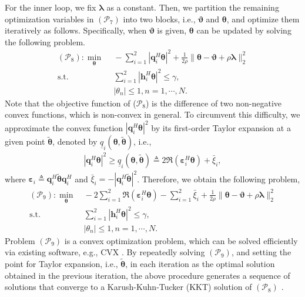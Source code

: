 \documentclass[10pt,final,doublecolumn]{IEEEtran}
\begin{document}
For the inner loop, we fix $\boldsymbol{\lambda}$ as a constant. Then, we partition the remaining optimization variables in $(\mathcal{P}_7)$ into two blocks, i.e., $\boldsymbol{\vartheta}$ and $\boldsymbol{\theta}$, and optimize them iteratively as follows. Specifically, when $\boldsymbol{\vartheta}$ is given, $\boldsymbol{\theta}$ can be  updated by solving the following problem.
\begin{subequations}
\begin{align}
(\mathcal{P}_8): \mathop{\min}\limits_{\boldsymbol{\theta}}~&~ -\sum_{i=1}^{2}|\mathbf{q}_i^H
\boldsymbol{\theta}|^2+\frac{1}{2\rho}\|\boldsymbol{\theta}-\boldsymbol{\vartheta} +\rho\boldsymbol{\lambda}\|_2^2 \label{OP3}\\
\text {s.t.}~&~\sum_{i=1}^{2}|{\mathbf{h}}_i^H
\boldsymbol{\theta}|^2\leq \gamma, \label{cd1}\\
~&~|\theta_n|\leq 1, n=1,\cdots,N. \label{ccc3}
\end{align}
\end{subequations}
Note that the objective function of ($\mathcal{P}_8$) is the difference of two non-negative convex functions, which is non-convex in general. To circumvent this difficulty, we approximate the convex function
$|\mathbf{q}_i^H\boldsymbol{\theta}|^2$ by its first-order Taylor expansion at a given point ${\tilde{\boldsymbol{\theta}}}$, denoted by $\underline{q}_i(\boldsymbol{\theta},{\tilde{\boldsymbol{\theta}}})$, i.e.,
\begin{align}\label{taylor1}
|\mathbf{q}_i^H\boldsymbol{\theta}|^2\geq\underline{q}_i(\boldsymbol{\theta}, {\tilde{\boldsymbol{\theta}}}) \triangleq 2 \Re(\bm{\varepsilon}_i^H\boldsymbol{\theta})+\bar{\xi}_i,
\end{align}
where $\bm{\varepsilon}_i\triangleq\mathbf{q}_i^H {\tilde{\boldsymbol{\theta}}}\mathbf{q}_i^H$ and $\bar{\xi}_i=-|\mathbf{q}_i^H{\tilde{\boldsymbol{\theta}}}|^2$.
Therefore, we obtain the following problem,
\begin{subequations}
\begin{align}
(\mathcal{P}_9): \mathop{\min}\limits_{\boldsymbol{\theta}}&~ -2 \sum_{i=1}^{2}\Re(\bm{\varepsilon}_i^H\boldsymbol{\theta})-\sum_{i=1}^{2}\bar{\xi}_i+\frac{1}{2\rho}\|\boldsymbol{\theta}-\boldsymbol{\vartheta} +\rho\boldsymbol{\lambda}\|_2^2 \label{OlP3}\\
\text {s.t.}&~\sum_{i=1}^{2}|{\mathbf{h}}_i^H
\boldsymbol{\theta}|^2\leq \gamma, \label{cld1}\\
&~|\theta_n|\leq 1, n=1,\cdots,N. \label{cl3}
\end{align}
\end{subequations}
Problem $(\mathcal{P}_9)$ is a convex optimization problem, which can
be solved efficiently via existing software, e.g., CVX \cite{cvx}.
By repeatedly solving $(\mathcal{P}_9)$, and setting the point for Taylor expansion,
i.e., ${\tilde{\boldsymbol{\theta}}}$, in each iteration as the optimal solution obtained in the previous iteration, the above procedure generates a sequence of solutions that converge to a Karush-Kuhn-Tucker (KKT) solution of $(\mathcal{P}_8)$ \cite{KKT}.
\end{document}
